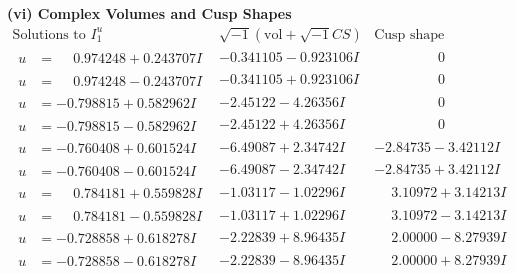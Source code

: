 \documentclass[1p]{elsarticle_modified}
\theoremstyle{definition}
\newcommand{\I}{\sqrt{-1}}
\begin{document}
\newpage\flushleft \textbf{(vi) Complex Volumes and Cusp Shapes}
$$\begin{array}{c|c|c}  
\text{Solutions to }I^u_{1}& \I (\text{vol} + \sqrt{-1}CS) & \text{Cusp shape}\\
 \hline 
\begin{aligned}
u &= \phantom{-}0.974248 + 0.243707 I\end{aligned}
 & -0.341105 - 0.923106 I & \phantom{-0.000000 } 0 \\ \hline\begin{aligned}
u &= \phantom{-}0.974248 - 0.243707 I\end{aligned}
 & -0.341105 + 0.923106 I & \phantom{-0.000000 } 0 \\ \hline\begin{aligned}
u &= -0.798815 + 0.582962 I\end{aligned}
 & -2.45122 - 4.26356 I & \phantom{-0.000000 } 0 \\ \hline\begin{aligned}
u &= -0.798815 - 0.582962 I\end{aligned}
 & -2.45122 + 4.26356 I & \phantom{-0.000000 } 0 \\ \hline\begin{aligned}
u &= -0.760408 + 0.601524 I\end{aligned}
 & -6.49087 + 2.34742 I & -2.84735 - 3.42112 I \\ \hline\begin{aligned}
u &= -0.760408 - 0.601524 I\end{aligned}
 & -6.49087 - 2.34742 I & -2.84735 + 3.42112 I \\ \hline\begin{aligned}
u &= \phantom{-}0.784181 + 0.559828 I\end{aligned}
 & -1.03117 - 1.02296 I & \phantom{-}3.10972 + 3.14213 I \\ \hline\begin{aligned}
u &= \phantom{-}0.784181 - 0.559828 I\end{aligned}
 & -1.03117 + 1.02296 I & \phantom{-}3.10972 - 3.14213 I \\ \hline\begin{aligned}
u &= -0.728858 + 0.618278 I\end{aligned}
 & -2.22839 + 8.96435 I & \phantom{-}2.00000 - 8.27939 I \\ \hline\begin{aligned}
u &= -0.728858 - 0.618278 I\end{aligned}
 & -2.22839 - 8.96435 I & \phantom{-}2.00000 + 8.27939 I \\ \hline\begin{aligned}

\end{aligned}
\end{array}$$
\end{document}
